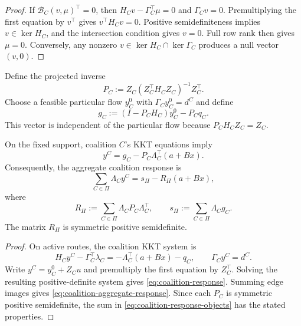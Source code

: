 \begin{proof}
If $\mathcal B_C(v,\mu)^\top=0$, then $H_Cv-\Gamma_C^\top\mu=0$ and $\Gamma_Cv=0$. Premultiplying the first equation by $v^\top$ gives $v^\top H_Cv=0$. Positive semidefiniteness implies $v\in\ker H_C$, and the intersection condition gives $v=0$. Full row rank then gives $\mu=0$. Conversely, any nonzero $v\in\ker H_C\cap\ker\Gamma_C$ produces a null vector $(v,0)$.
\end{proof}

Define the projected inverse
\begin{equation}\label{eq:coalition-projected-inverse}
 P_C:=Z_C(Z_C^\top H_CZ_C)^{-1}Z_C^\top.
\end{equation}
Choose a feasible particular flow $y_C^0$ with $\Gamma_Cy_C^0=d^C$ and define
\begin{equation}\label{eq:coalition-intercept}
 g_C:=(I-P_CH_C)y_C^0-P_Cq_C.
\end{equation}
This vector is independent of the particular flow because $P_CH_CZ_C=Z_C$.

\begin{proposition}\label{prop:coalition-response}
On the fixed support, coalition $C$'s KKT equations imply
\begin{equation}\label{eq:coalition-response}
 y^C=g_C-P_C\Lambda_C^\top(a+Bx).
\end{equation}
Consequently, the aggregate coalition response is
\begin{equation}\label{eq:coalition-aggregate-response}
 \sum_{C\in\Pi}\Lambda_Cy^C=s_\Pi-R_\Pi(a+Bx),
\end{equation}
where
\begin{equation}\label{eq:coalition-response-objects}
 R_\Pi:=\sum_{C\in\Pi}\Lambda_CP_C\Lambda_C^\top,
 \qquad s_\Pi:=\sum_{C\in\Pi}\Lambda_Cg_C.
\end{equation}
The matrix $R_\Pi$ is symmetric positive semidefinite.
\end{proposition}

\begin{proof}
On active routes, the coalition KKT system is
\[
 H_Cy^C-\Gamma_C^\top\lambda_C=-\Lambda_C^\top(a+Bx)-q_C,
 \qquad \Gamma_Cy^C=d^C.
\]
Write $y^C=y_C^0+Z_Cu$ and premultiply the first equation by $Z_C^\top$. Solving the resulting positive-definite system gives \eqref{eq:coalition-response}. Summing edge images gives \eqref{eq:coalition-aggregate-response}. Since each $P_C$ is symmetric positive semidefinite, the sum in \eqref{eq:coalition-response-objects} has the stated properties.
\end{proof}

